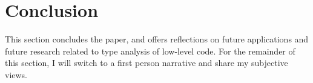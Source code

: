 
\section{Conclusion}

This section concludes the paper, and offers reflections on future applications and future research related to type analysis of low-level code. For the remainder of this section, I will switch to a first person narrative and share my subjective views.


%




